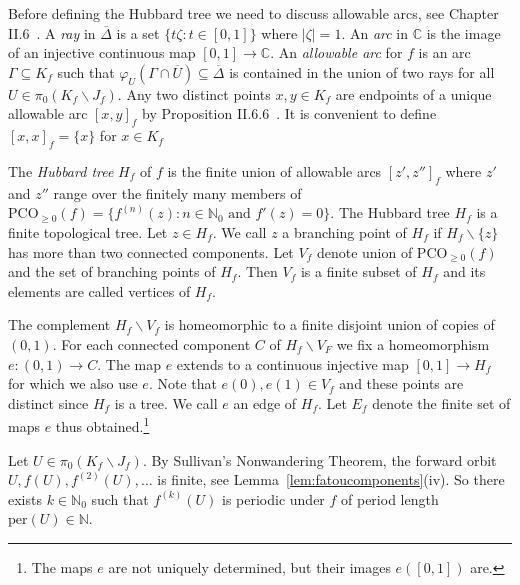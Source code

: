 \documentclass[12pt,oneside,a4]{amsart}
\newcommand{\IC}{\mathbb{C}}
\newcommand{\IN}{\mathbb{N}}
\numberwithin{maincounter}{section}
\numberwithin{equation}{section}
\renewcommand{\subset}{\subseteq}
\newcommand{\ssm}{\smallsetminus}
\newcommand{\pco}{\mathrm{PCO}}
\begin{document}
Before defining the Hubbard tree we need to discuss allowable arcs, see
Chapter II.6~\cite{DH:etudedynI}. 
A \textit{ray} in $\overline\Delta$ is a set  $\{t\zeta : t\in [0,1]\}$ where
$|\zeta|=1$. An \textit{arc} in $\IC$ is the image of an injective continuous map
$[0,1]\rightarrow\IC$. An \textit{allowable arc} for $f$ is an arc
$\Gamma\subset K_f$ such that $\varphi_U(\Gamma\cap \overline
U)\subset\overline\Delta$ is contained in the union of two rays for
all $U\in\pi_0(K_f\ssm J_f)$. Any two distinct points $x,y\in K_f$ are
endpoints of a unique allowable arc $[x,y]_f$ by Proposition
II.6.6~\cite{DH:etudedynI}. It is convenient to define $[x,x]_f = \{x\}$
for $x\in K_f$

The \emph{Hubbard tree} $H_f$ of $f$ is the finite union of allowable
arcs $[z',z'']_f$ where $z'$ and $z''$ range over the finitely many
members of $\pco_{\ge 0}(f) = \{f^{(n)}(z) : n\in\IN_0 \text{ and }
f'(z)=0\}$. The Hubbard tree $H_f$ is a finite topological tree. Let
$z\in H_f$. We call $z$ a branching point of $H_f$ if $H_f\ssm\{z\}$
has more than two connected components. Let $V_f$ denote union of
$\pco_{\ge 0}(f)$ and the set of branching points of $H_f$. Then $V_f$
is a finite subset of $H_f$ and its elements are called vertices of
$H_f$.

The complement $H_f\ssm V_f$ is homeomorphic to a finite disjoint
union of copies of $(0,1)$. For each connected component $C$ of
$H_f\ssm V_F$ we fix a homeomorphism $e\colon (0,1)\rightarrow C$. The
map $e$ extends to a continuous injective map $[0,1]\rightarrow H_f$ for which
we also use $e$. Note that $e(0),e(1)\in V_f$ and these points
are distinct since $H_f$ is a tree. We call $e$ an edge of $H_f$. Let
$E_f$ denote the finite set of maps $e$ thus obtained.\footnote{The
  maps $e$ are not uniquely determined, but their images $e([0,1])$ are.}

Let $U\in \pi_0(K_f\ssm J_f)$. By Sullivan's Nonwandering Theorem, the
forward orbit $U,f(U),f^{(2)}(U),\ldots$ is finite, see
Lemma~\ref{lem:fatoucomponents}(iv). So there exists $k\in\IN_0$ such
that $f^{(k)}(U)$ is periodic under $f$ of period length
$\mathrm{per}(U)\in\IN$.
\end{document}
